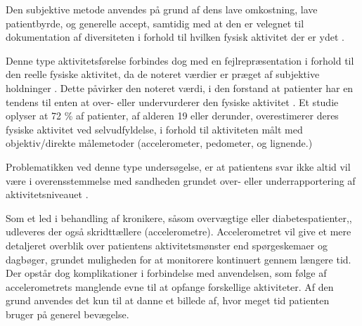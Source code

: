 
Den subjektive metode anvendes på grund af dens lave omkostning, lave patientbyrde, og generelle accept, samtidig med at den er velegnet til dokumentation af diversiteten i forhold til hvilken fysisk aktivitet der er ydet \citep{adamo2009}.


Denne type aktivitetsførelse forbindes dog med en fejlrepræsentation i forhold til den reelle fysiske aktivitet, da de noteret værdier er præget af subjektive holdninger \citep{adamo2009}. Dette påvirker den noteret værdi, i den forstand at patienter har en tendens til enten at over- eller undervurderer den fysiske aktivitet \citep{adamo2009}.
Et studie oplyser at 72 \% af patienter, af alderen 19 eller derunder, overestimerer deres fysiske aktivitet ved selvudfyldelse, i forhold til aktiviteten målt med objektiv/direkte målemetoder (accelerometer, pedometer, og lignende.) \citep{adamo2009}


Problematikken ved denne type undersøgelse, er at patientens svar ikke altid vil være i overensstemmelse med sandheden grundet over- eller underrapportering af aktivitetsniveauet \citep{gupta2013}.


Som et led i behandling af kronikere, såsom overvægtige eller diabetespatienter,, udleveres der også skridttællere (accelerometre)\citep{muller2009, jensen2012, snorgaard2010}. 
Accelerometret vil give et mere detaljeret overblik over patientens aktivitetsmønster end spørgeskemaer og dagbøger, grundet muligheden for at monitorere kontinuert gennem længere tid. 
Der opstår dog komplikationer i forbindelse med anvendelsen, som følge af accelerometrets manglende evne til at opfange forskellige aktiviteter. 
Af den grund anvendes det kun til at danne et billede af, hvor meget tid patienten bruger på generel bevægelse. \citep{gupta2013}